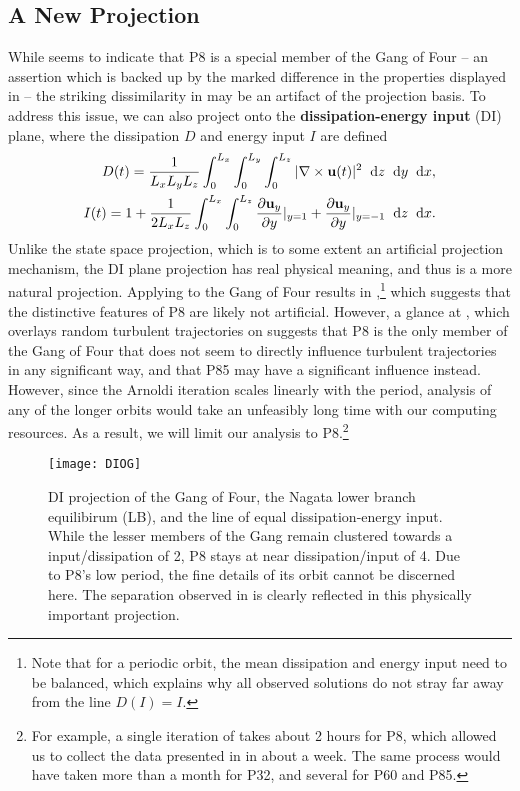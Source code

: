 \subsection{A New Projection}
While  seems to indicate that P8 is a special member of the Gang of Four -- an assertion which is backed up by the marked difference in the properties displayed in  -- the striking dissimilarity in  may be an artifact of the projection basis. To address this issue, we can also project onto the {\bf dissipation-energy input} (DI) plane, where the dissipation $D$ and energy input $I$ are defined
\begin{align}
D(t) = \frac{1}{L_xL_yL_z}\int{0}{L_x}{\int{0}{L_y}{\int{0}{L_z}{|\nabla\times\Vector{u}(t)|^2}{\textrm{d}z}}{\textrm{d}y}}{\textrm{d}x},\label{eq:diss}\\
I(t)  = 1 + \frac{1}{2L_xL_z}\int{0}{L_x}{\int{0}{L_z}{\pder{1}{\Vector{u}_{y}}{y} |_{y=1}+\pder{1}{\Vector{u}_{y}}{y} |_{y=-1}}{\textrm{d}z}}{\textrm{d}x}.\label{eq:einp}
\end{align} 
Unlike the state space projection, which is to some extent an artificial projection mechanism, the DI plane projection has real physical meaning, and thus is a more natural projection. Applying  to the Gang of Four results in ,\footnote{Note that for a periodic orbit, the mean dissipation and energy input need to be balanced, which explains why all observed solutions do not stray far away from the line $D(I) = I$.} which suggests that the distinctive features of P8 are likely not artificial. However, a glance at , which overlays random turbulent trajectories on  suggests that P8 is the only member of the Gang of Four that does not seem to directly influence turbulent trajectories in any significant way, and that P85 may have a significant influence instead. However, since the Arnoldi iteration scales linearly with the period, analysis of any of the longer orbits would take an unfeasibly long time with our computing resources. As a result, we will limit our analysis to P8.\footnote{For example, a single iteration of  takes about 2 hours for P8, which allowed us to collect the data presented in  in about a week. The same process would have taken more than a month for P32, and several for P60 and P85.}   
\begin{figure}[h]
\texttt{[image: DIOG]}
\caption{DI projection of the Gang of Four, the Nagata lower branch equilibirum (LB), and the line of equal dissipation-energy input. While the lesser members of the Gang remain clustered towards a input/dissipation of 2, P8 stays at near dissipation/input of 4. Due to P8's low period, the fine details of its orbit cannot be discerned here. The separation observed in  is clearly reflected in this physically important projection.}\label{fig:DIGOF}
\end{figure}

